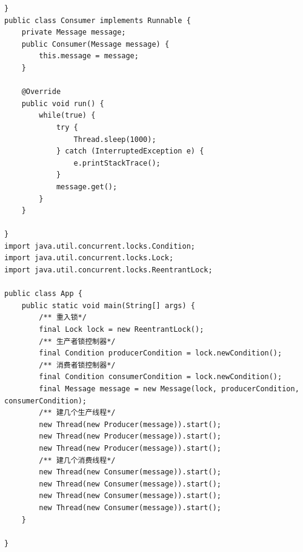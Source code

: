 \documentclass[UTF8]{ctexart}
\begin{document}
\begin{lstlisting}
}
public class Consumer implements Runnable {
	private Message message;
	public Consumer(Message message) {
		this.message = message;
	}
	
	@Override
	public void run() {
		while(true) {
			try {
				Thread.sleep(1000);
			} catch (InterruptedException e) {
				e.printStackTrace();
			}
			message.get();
		}
	}
	
}
import java.util.concurrent.locks.Condition;
import java.util.concurrent.locks.Lock;
import java.util.concurrent.locks.ReentrantLock;

public class App {
	public static void main(String[] args) {
		/** 重入锁*/
		final Lock lock = new ReentrantLock();
		/** 生产者锁控制器*/
		final Condition producerCondition = lock.newCondition();
		/** 消费者锁控制器*/
		final Condition consumerCondition = lock.newCondition();
		final Message message = new Message(lock, producerCondition, consumerCondition);
		/** 建几个生产线程*/
		new Thread(new Producer(message)).start();
		new Thread(new Producer(message)).start();
		new Thread(new Producer(message)).start();
		/** 建几个消费线程*/
		new Thread(new Consumer(message)).start();
		new Thread(new Consumer(message)).start();
		new Thread(new Consumer(message)).start();
		new Thread(new Consumer(message)).start();
	}
	
}


\end{lstlisting}
\end{document}
